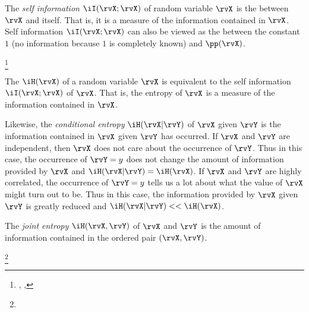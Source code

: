 The {\em self information} $\iI(\rvX;\rvX)$ of random variable $\rvX$ is the 
 between $\rvX$ and itself.
That is, it is a measure of the information contained in $\rvX$.
Self information $\iI(\rvX;\rvX)$ can also be viewed as the  between
the constant $1$ (no information because $1$ is completely known)
and $\pp(\rvX)$.
\begin{definition}
\footnote{
  ,
  ,
  }
\label{def:I(X;X)}
\end{definition}

The  $\iH(\rvX)$ of a random variable $\rvX$ is equivalent to
the self information $\iI(\rvX;\rvX)$ of $\rvX$.
That is, the entropy of $\rvX$ is a measure of the information contained
in $\rvX$.

Likewise, the {\em conditional entropy} $\iH(\rvX|\rvY)$ 
of $\rvX$ given $\rvY$ is the information
contained in $\rvX$ given $\rvY$ has occurred. 
If $\rvX$ and $\rvY$ are independent, then $\rvX$ does not care about the occurrence of
$\rvY$. Thus in this case, 
the occurrence of $\rvY=y$ does not change the amount of information
provided by $\rvX$ and $\iH(\rvX|\rvY)=\iH(\rvX)$.
If $\rvX$ and $\rvY$ are highly correlated, 
the occurrence of $\rvY=y$ tells us a lot about what the value of $\rvX$ might
turn out to be.
Thus in this case, the information provided by $\rvX$ given $\rvY$ is greatly reduced
and $\iH(\rvX|\rvY)<<\iH(\rvX)$.

The {\em joint entropy} $\iH(\rvX,\rvY)$ of $\rvX$ and $\rvY$ is the amount of information 
contained in the ordered pair $(\rvX,\rvY)$.

\begin{definition}[Entropy]
\footnote{
  }
\label{def:H(X)}
\label{def:H(XY)}
\end{definition}


